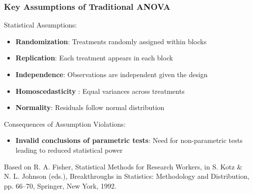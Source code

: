 \documentclass[aspectratio=43]{beamer}
\begin{document}
\begin{frame}
    \frametitle{\small Key Assumptions of Traditional ANOVA}
    
    \begin{block}{Statistical Assumptions:}
        \begin{itemize}
            \item \textbf{Randomization}: Treatments randomly assigned within blocks
            \item \textbf{Replication}: Each treatment appears in each block
            \item \textbf{Independence}: Observations are independent given the design
            \item \textbf{Homoscedasticity }: Equal variances across treatments
            \item \textbf{Normality}: Residuals follow normal distribution
        \end{itemize}
    \end{block}

    \begin{alertblock}{Consequences of Assumption Violations:}
        \begin{itemize}
            \item \textbf{Invalid conclusions of parametric tests}: Need for non-parametric tests leading to reduced statistical power
        \end{itemize}
    \end{alertblock}
    
    \vfill
    {\tiny
    \begin{flushleft}
        Based on R. A. Fisher, Statistical Methods for Research Workers, in S. Kotz \& N. L. Johnson (eds.), Breakthroughs in Statistics: Methodology and Distribution, pp. 66--70, Springer, New York, 1992.
    \end{flushleft}
    }
\end{frame}
\end{document}
